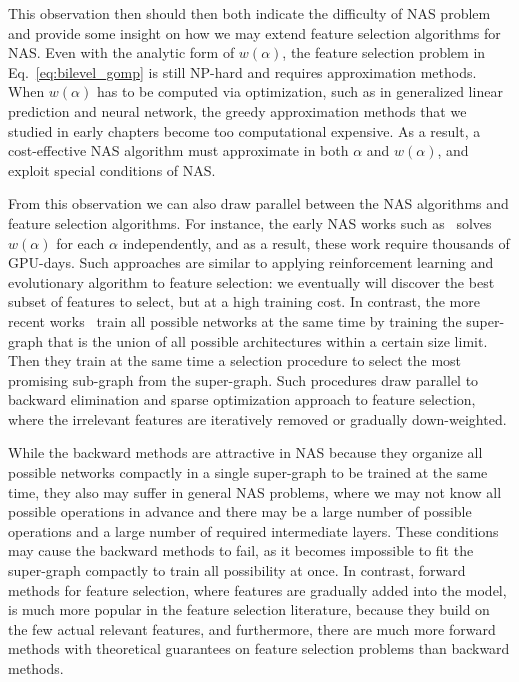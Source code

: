 This observation then should then both indicate the difficulty of NAS problem and provide some insight on
how we may extend feature selection algorithms for NAS. 
Even with the analytic form of $w(\alpha)$, the feature selection problem in Eq.~\ref{eq:bilevel_gomp} 
is still NP-hard and requires approximation methods. 
When $w(\alpha)$ has to be computed via optimization, such as in generalized linear prediction
and neural network, the greedy approximation methods that we studied in early chapters become 
too computational expensive. 
As a result, a cost-effective NAS algorithm must approximate in both $\alpha$ and $w(\alpha)$, 
and exploit special conditions of NAS. 

From this observation we can also draw parallel between the NAS algorithms and 
feature selection algorithms. For instance, the early NAS works such as~\citep{nas,Real2017EvoNet}
solves $w(\alpha)$ for each $\alpha$ independently, and as a result, these work require
thousands of GPU-days. Such approaches are similar to 
applying reinforcement learning and evolutionary algorithm to feature selection: 
we eventually will discover the best subset of features to select, but at a high training cost.
In contrast, the more recent works~\citep{Pham2018EfficientNA,Liu2018DARTSDA} train all possible
networks at the same time by training the super-graph that is the union of all possible architectures within 
a certain size limit. 
Then they train at the same time a selection procedure to select the most promising 
sub-graph from the super-graph. Such procedures draw parallel to backward elimination 
and sparse optimization approach to feature selection, 
where the irrelevant features are iteratively removed or gradually down-weighted. 

While the backward methods are attractive in NAS because they organize all possible networks 
compactly in a single super-graph to be trained at the same time, they also may suffer 
in general NAS problems, where we may not know all possible operations 
in advance and there may be a large number of possible operations and a 
large number of required intermediate layers. These conditions may cause the backward methods to fail, as 
it becomes impossible to fit the super-graph compactly to train all possibility at once.
In contrast, forward methods for feature selection, where
features are gradually added into the model, is much more popular in the feature selection
literature, because they build on the few actual relevant features, and furthermore, 
there are much more forward methods with theoretical guarantees on feature selection
problems than backward methods. 

